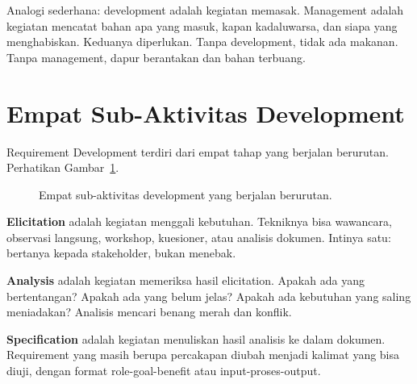 \documentclass[11pt,a4paper]{article}
\begin{document}
Analogi sederhana: development adalah kegiatan memasak. Management adalah kegiatan mencatat bahan apa yang masuk, kapan kadaluwarsa, dan siapa yang menghabiskan. Keduanya diperlukan. Tanpa development, tidak ada makanan. Tanpa management, dapur berantakan dan bahan terbuang.

\section{Empat Sub-Aktivitas Development}

Requirement Development terdiri dari empat tahap yang berjalan berurutan. Perhatikan Gambar~\ref{fig:four-sub}.

\begin{figure}[H]
	\centering
	\caption{Empat sub-aktivitas development yang berjalan berurutan.}
	\label{fig:four-sub}
\end{figure}

\textbf{Elicitation} adalah kegiatan menggali kebutuhan. Tekniknya bisa wawancara, observasi langsung, workshop, kuesioner, atau analisis dokumen. Intinya satu: bertanya kepada stakeholder, bukan menebak.

\textbf{Analysis} adalah kegiatan memeriksa hasil elicitation. Apakah ada yang bertentangan? Apakah ada yang belum jelas? Apakah ada kebutuhan yang saling meniadakan? Analisis mencari benang merah dan konflik.

\textbf{Specification} adalah kegiatan menuliskan hasil analisis ke dalam dokumen. Requirement yang masih berupa percakapan diubah menjadi kalimat yang bisa diuji, dengan format role-goal-benefit atau input-proses-output.
\end{document}

